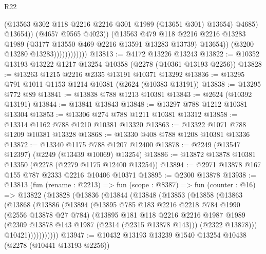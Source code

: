 \begin{lexlean}{R22}
\begin{coremodule}
                                    (@13563 @302 @118 @2216 @2216 @301 @1989 (@13651 @301) @13654)
                                    @4685)
                                  @13654))
                              (@4657 @9565 @4023))
                            (@13563
                              @479
                              @118
                              @2216
                              @2216
                              @13283
                              @1989
                              (@3177 @13550 @469 @2216 @13591 @13283 @13739)
                              @13654))
                          (@3200 @13280 @13283))))))))))))
@13813 := @4172 @13226 @13243
@13822 := @10352 @13193 @13222 @1217 @13254 @10358 (@2278 (@10361 @13193 @2256))
@13828 := @13263 @1215 @2216 @2335 @13191 @10371 @13292
@13836 := @13295 @791 @1011 @1153 @1214 @10381 (@2624 (@10383 @13191))
@13838 := @13295 @772 @89
@13841 := @13838 @788 @1213 @10381
@13843 := @2624 (@10392 @13191)
@13844 := @13841 @13843
@13848 := @13297 @788 @1212 @10381 @13304
@13853 := @13306 @274 @788 @1211 @10381 @13312
@13858 := @13314 @1162 @788 @1210 @10381 @13320
@13863 := @13322 @1071 @788 @1209 @10381 @13328
@13868 := @13330 @408 @788 @1208 @10381 @13336
@13872 := @13340 @1175 @788 @1207 @12400
@13878 := @2249 (@13547 @12397) (@2249 (@13439 @10069) @13254)
@13886 := @13872 @13878 @10381 @13350 (@2278 (@2279 @1175 @12400 @13254))
@13894 := @2971 @13878 @167 @155 @787 @2333 @2216 @10406 @10371
@13895 := @2300 @13878
@13938 := @13813
    (fun (rename : @2213) =>
    fun (scope : @8387) =>
    fun (counter : @16) =>
    @13822
      (@13828
        (@13836
          (@13844
            (@13848
              (@13853
                (@13858
                  (@13863
                    (@13868
                      (@13886
                        (@13894
                          (@13895
                            @785
                            @183
                            @2216
                            @2218
                            @784
                            @1990
                            (@2556 @13878 @27 @784)
                            (@13895
                              @181
                              @118
                              @2216
                              @2216
                              @1987
                              @1989
                              (@2309 @13878 @143 @1987 (@2314 (@2315 @13878 @143)))
                              (@2322 @13878)))
                          @10421)))))))))))
@13947 := @10432 @13193 @13239 @1540 @13254 @10438 (@2278 (@10441 @13193 @2256))

\end{coremodule}
\end{lexlean}
